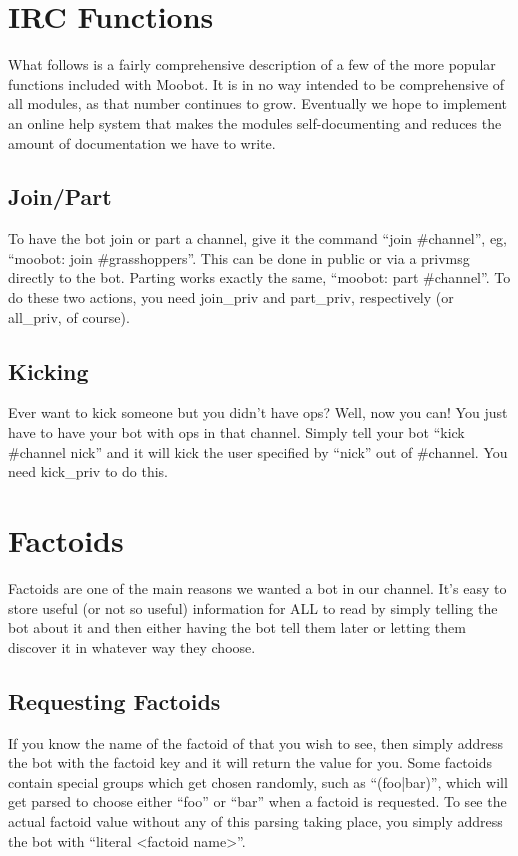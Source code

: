 \documentclass[titlepage]{article}
\begin{document}
	\section{IRC Functions}
		What follows is a fairly comprehensive description of a few of the
		more popular functions included with Moobot.  It is in no way intended
		to be comprehensive of all modules, as that number continues to grow.
		Eventually we hope to implement an online help system that makes the
		modules self-documenting and reduces the amount of documentation we
		have to write.
	
		\subsection{Join/Part}
			To have the bot join or part a channel, give it the command ``join
			\#channel'', eg, ``moobot: join \#grasshoppers''.  This can be
			done in public or via a privmsg directly to the bot.  Parting
			works exactly the same, ``moobot: part \#channel''.  To do these
			two actions, you need join\_priv and part\_priv, respectively (or
			all\_priv, of course).
		\subsection{Kicking}
			Ever want to kick someone but you didn't have ops?  Well, now you
			can!  You just have to have your bot with ops in that channel.
			Simply tell your bot ``kick \#channel nick'' and it will kick the
			user specified by ``nick'' out of \#channel.  You need kick\_priv
			to do this.

	\section{Factoids}
		Factoids are one of the main reasons we wanted a bot in our channel.
		It's easy to store useful (or not so useful) information for ALL to
		read by simply telling the bot about it and then either having the bot
		tell them later or letting them discover it in whatever way they
		choose.
		
		\subsection{Requesting Factoids}
			If you know the name of the factoid of that you wish to see, then
			simply address the bot with the factoid key and it will return the
			value for you.  Some factoids contain special groups which get
			chosen randomly, such as ``(foo|bar)'', which will get parsed to
			choose either ``foo'' or ``bar'' when a factoid is requested.  To
			see the actual factoid value without any of this parsing taking
			place, you simply address the bot with ``literal <factoid name>''.
	
\end{document}
